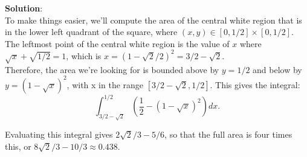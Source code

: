 \documentclass[10pt,a4paper]{article}
\begin{document}
\textbf{Solution}:\\
To make things easier, we'll compute the area of the central white region that is in the lower left quadrant of the square, where $(x, y) \in [0, 1/2]\times[0, 1/2]$. The leftmost point of the central white region is the value of $x$ where $\sqrt{x} + \sqrt{1/2} = 1$, which is $x = (1-\sqrt{2}/2)^2 = 3/2-\sqrt{2}$.\\

Therefore, the area we're looking for is bounded above by $y = 1/2$ and below by $y = (1-\sqrt{x})^2$, with x in the range $[3/2-\sqrt{2}, 1/2]$. This gives the integral:
\begin{equation}
\label{eq:integral}
\int_{3/2-\sqrt{2}}^{1/2}\left(\frac{1}{2} - (1-\sqrt{x})^2\right)dx.
\end{equation}

Evaluating this integral gives $2\sqrt{2}/3 - 5/6$, so that the full area is four times this, or $8\sqrt{2}/3 - 10/3 \approx 0.438$.
\end{document}
